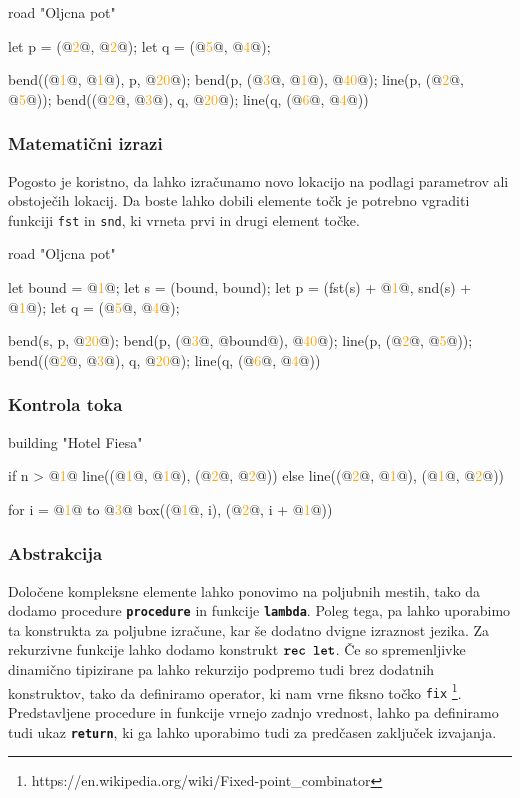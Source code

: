 \documentclass{article}
\newcommand\Num[1]{\textcolor{orange}{#1}}
\newcommand\Keyword[1]{{\textbf{\texttt{#1}}}}
\newcommand\Fun[1]{{\texttt{#1}}}
\begin{document}
\begin{CITY}
  road "Oljcna pot" {
    let p = (@\Num{2}@, @\Num{2}@);
    let q = (@\Num{5}@, @\Num{4}@);

    bend((@\Num{1}@, @\Num{1}@), p, @\Num{20}@);
    bend(p, (@\Num{3}@, @\Num{1}@), @\Num{40}@);
    line(p, (@\Num{2}@, @\Num{5}@));
    bend((@\Num{2}@, @\Num{3}@), q, @\Num{20}@);
    line(q, (@\Num{6}@, @\Num{4}@))
  }
\end{CITY}

\subsubsection{Matematični izrazi}
Pogosto je koristno, da lahko izračunamo novo lokacijo na podlagi parametrov ali obstoječih lokacij.
Da boste lahko dobili elemente točk je potrebno vgraditi funkciji \Fun{fst} in \Fun{snd}, ki vrneta prvi in drugi element točke.

\begin{CITY}
  road "Oljcna pot" {
    let bound = @\Num{1}@;
    let s = (bound, bound);
    let p = (fst(s) + @\Num{1}@, snd(s) + @\Num{1}@);
    let q = (@\Num{5}@, @\Num{4}@);

    bend(s, p, @\Num{20}@);
    bend(p, (@\Num{3}@, @bound@), @\Num{40}@);
    line(p, (@\Num{2}@, @\Num{5}@));
    bend((@\Num{2}@, @\Num{3}@), q, @\Num{20}@);
    line(q, (@\Num{6}@, @\Num{4}@))
  }
\end{CITY}

\subsubsection{Kontrola toka}

\begin{CITY}
  building "Hotel Fiesa" {
    if n > @\Num{1}@ {
      line((@\Num{1}@, @\Num{1}@), (@\Num{2}@, @\Num{2}@))
    } else {
      line((@\Num{2}@, @\Num{1}@), (@\Num{1}@, @\Num{2}@))
    }

    for i = @\Num{1}@ to @\Num{3}@ {
      box((@\Num{1}@, i), (@\Num{2}@, i + @\Num{1}@))
    }
  }
\end{CITY}

\subsubsection{Abstrakcija}
Določene kompleksne elemente lahko ponovimo na poljubnih mestih, tako da dodamo procedure \Keyword{procedure} in funkcije \Keyword{lambda}.
Poleg tega, pa lahko uporabimo ta konstrukta za poljubne izračune, kar še dodatno dvigne izraznost jezika.
Za rekurzivne funkcije lahko dodamo konstrukt $\Keyword{rec let}$.
Če so spremenljivke dinamično tipizirane pa lahko rekurzijo podpremo tudi brez dodatnih konstruktov, tako da definiramo operator, ki nam vrne fiksno točko \Fun{fix} \footnote{https://en.wikipedia.org/wiki/Fixed-point\_combinator}.
Predstavljene procedure in funkcije vrnejo zadnjo vrednost, lahko pa definiramo tudi ukaz \Keyword{return}, ki ga lahko uporabimo tudi za predčasen zaključek izvajanja.
\end{document}
